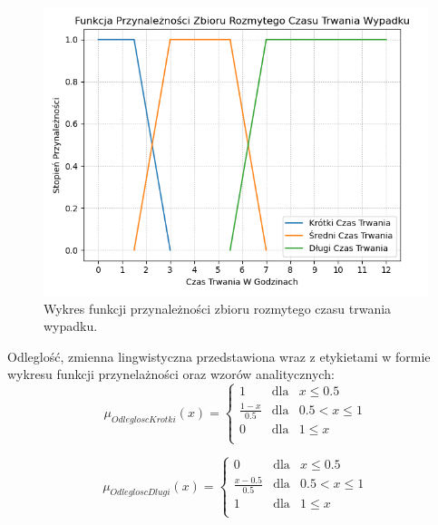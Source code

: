 \documentclass{classrep}
\begin{document}
\begin{figure}[h!]
 \centering
 \includegraphics[width=14cm]{FunkcjaPrzynaleznosciCzasTrwania.png}
 \vspace{-0.3cm}
 \caption{Wykres funkcji przynależności zbioru rozmytego czasu trwania wypadku. }
 \label{rysunek do eksperymentu 1 wariantu 1}
\end{figure}
\newpage


Odleglość, zmienna lingwistyczna przedstawiona wraz z etykietami w formie wykresu funkcji przynelażności oraz wzorów analitycznych:
\begin{equation}
\mu _{OdlegloscKrotki}(x) =  \left\{ \begin{array}{rcl}
 1 & \mbox{dla} & x  \leq 0.5 \\
\frac{1 - x}{0.5} & \mbox{dla} & 0.5 < x \leq 1\\
0 & \mbox{dla} & 1 \leq x\\
\end{array}\right.
\end{equation}

\begin{equation}
\mu _{OdlegloscDlugi}(x) =  \left\{ \begin{array}{rcl}
 0 & \mbox{dla} & x \leq 0.5 \\
\frac{x - 0.5}{0.5} & \mbox{dla} & 0.5 < x \leq 1\\
1 & \mbox{dla} & 1 \leq x\\
\end{array}\right.
\end{equation}
\end{document}
